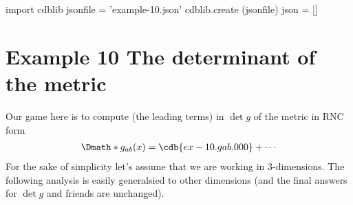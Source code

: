 \documentclass[12pt]{cdblatex}
\begin{document}
\bgroup
{}
\begin{cadabra}
   import cdblib
   jsonfile = 'example-10.json'
   cdblib.create (jsonfile)
   json = []
\end{cadabra}
\egroup

\clearpage

\section*{Example 10 The determinant of the metric}

Our game here is to compute (the leading terms) in $\det g$ of the metric in RNC form
\begin{dgroup*}
   \Dmath*{g_{a b}(x) = \cdb{ex-10.gab.000}+\cdots}
\end{dgroup*}
For the sake of simplicity let's assume that we are working in 3-dimensions. The following
analysis is easily generalsied to other dimensions (and the final answers for $\det g$ and
friends are unchanged).
\end{document}
